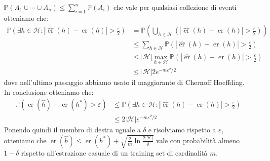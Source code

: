 \documentclass[\main/main.tex]{subfiles}
\begin{document}
\begin{observation}
\begin{multicols}{2}
        \(
            \mathbb{P}\left(A_{1} \cup \cdots \cup A_{n}\right) \leq \sum_{i=1}^{n} \mathbb{P}\left(A_{i}\right)
        \)
        che vale per qualsiasi collezione di eventi otteniamo che:
        \begin{align*}
            \mathbb{P}\left(\exists h \in \mathcal{H} :|\widehat{\operatorname{er}}(h)-\operatorname{er}(h)|>\frac{\varepsilon}{2}\right) &=\mathbb{P}\left(\bigcup_{h \in \mathcal{H}}\left(|\widehat{\operatorname{er}}(h)-\operatorname{er}(h)|>\frac{\varepsilon}{2}\right)\right) \\ & \leq \sum_{h \in \mathcal{H}} \mathbb{P}\left(|\widehat{\operatorname{er}}(h)-\operatorname{er}(h)|>\frac{\varepsilon}{2}\right) \\ & \leq|\mathcal{H}| \max _{h \in \mathcal{H}} \mathbb{P}\left(|\widehat{\operatorname{er}}(h)-\operatorname{er}(h)|>\frac{\varepsilon}{2}\right) \\ & \leq|\mathcal{H}| 2 e^{-m \varepsilon^{2} / 2}
        \end{align*}
        dove nell'ultimo passaggio abbiamo usato il maggiorante di Chernoff Hoeffding. In conclusione otteniamo che:
        \begin{align*}
            \mathbb{P}\left(\operatorname{er}(\widehat{h})-\operatorname{er}\left(h^{*}\right)>\varepsilon\right) &\leq \mathbb{P}\left(\exists h \in \mathcal{H} :|\widehat{\operatorname{er}}(h)-\operatorname{er}(h)|>\frac{\varepsilon}{2}\right)\\ &\leq 2|\mathcal{H}| e^{-m \varepsilon^{2} / 2}
        \end{align*}
        Ponendo quindi il membro di destra uguale a \(\delta\) e risolviamo rispetto a \(\varepsilon\), otteniamo che
        \(
            \operatorname{er}(\widehat{h}) \leq \operatorname{er}\left(h^{*}\right)+\sqrt{\frac{2}{m} \ln \frac{2|\mathcal{H}|}{\delta}}
        \)
        vale con probabilità almeno \(1-\delta\) rispetto all'estrazione casuale di un training set di cardinalità \(m\).
        

\end{multicols}
\end{observation}
\end{document}
